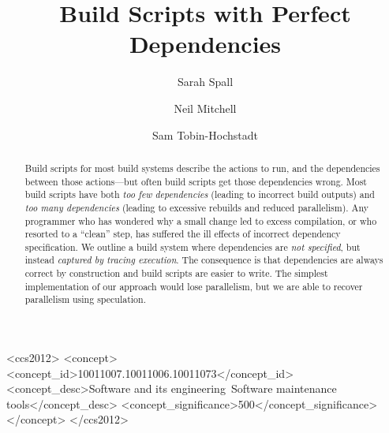 \documentclass[acmsmall,screen]{acmart}
\begin{document}
\newcommand{\Make}{\textsc{Make}\xspace}
\newcommand{\Rattle}{\textsc{Rattle}\xspace}
\newcommand{\Fabricate}{\textsc{Fabricate}\xspace}
\newcommand{\Bazel}{\textsc{Bazel}\xspace}
\newcommand{\Buck}{\textsc{Buck}\xspace}
\newcommand{\Shake}{\textsc{Shake}\xspace}
\newcommand{\Bigbro}{\textsc{BigBro}\xspace}
\newcommand{\Fac}{\textsc{Fac}\xspace}
\newcommand{\Fsatrace}{\textsc{Fsatrace}\xspace}
\newcommand{\tracedfs}{\textsc{Traced-Fs}\xspace}
\newcommand{\BuildXL}{\textsc{BuildXL}\xspace}
\newcommand{\Nix}{\textsc{Nix}\xspace}
\newcommand{\Memoize}{\textsc{Memoize}\xspace}
\newcommand{\Stroll}{\textsc{Stroll}\xspace}
\newcommand{\Pluto}{\textsc{Pluto}\xspace}
\newcommand{\PIE}{\textsc{PIE}\xspace}

\newcommand{\postparagraphs}{\vspace{3mm}\noindent}


\title{Build Scripts with Perfect Dependencies}

\author{Sarah Spall}

\author{Neil Mitchell}

\author{Sam Tobin-Hochstadt}


\begin{abstract}
Build scripts for most build systems describe the actions to run, and the dependencies between those actions---but often build scripts get those dependencies wrong.
Most build scripts have both \emph{too few dependencies} (leading to incorrect build outputs) and \emph{too many dependencies} (leading to excessive rebuilds and reduced parallelism). Any programmer who has wondered why a small change led to excess compilation, or who resorted to a ``clean'' step, has suffered the ill effects of incorrect dependency specification.
We outline a build system where dependencies are \emph{not specified}, but instead \emph{captured by tracing execution}.
The consequence is that dependencies are always correct by construction and build scripts are easier to write.
The simplest implementation of our approach would lose parallelism, but we are able to recover parallelism using speculation.
\end{abstract}

\begin{CCSXML}
<ccs2012>
<concept>
<concept_id>10011007.10011006.10011073</concept_id>
<concept_desc>Software and its engineering~Software maintenance tools</concept_desc>
<concept_significance>500</concept_significance>
</concept>
</ccs2012>
\end{CCSXML}

\maketitle











\end{document}
